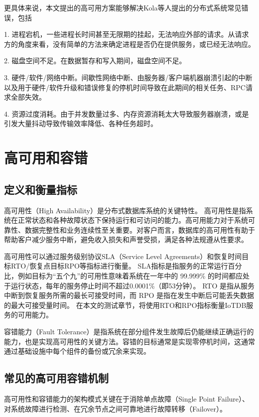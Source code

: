 更具体来说，本文提出的高可用方案能够解决Kola\cite{kola2005faults}等人提出的分布式系统常见错误，包括

1. 进程宕机，一些进程长时间甚至无限期的挂起，无法响应外部的请求。从请求方的角度来看，没有简单的方法来确定进程是否仍在提供服务，或已经无法响应。

2. 磁盘空间不足。在数据暂存和写入期间，磁盘空间不足。

3. 硬件/软件/网络中断。间歇性网络中断、由服务器/客户端机器崩溃引起的中断以及用于硬件/软件升级和错误修复的停机时间导致在此期间的相关任务、RPC请求全部失效。

4. 资源过度消耗。由于并发数量过多、内存资源消耗太大导致服务器崩溃，或是引发大量抖动导致传输效率降低、各种任务超时。


\section{高可用和容错}

\subsection{定义和衡量指标}

高可用性（High Availability）是分布式数据库系统的关键特性。
高可用性是指系统在正常状态和各种故障状态下保持运行和可访问的能力。高可用能力对于系统可靠性、数据完整性和业务连续性至关重要。对客户而言，数据库的高可用性有助于帮助客户减少服务中断，避免收入损失和声誉受损，满足各种法规遵从性要求。


高可用性可以通过服务级别协议SLA（Service Level Agreements）和恢复时间目标RTO/恢复点目标RPO等指标进行衡量。
SLA指标是指服务的正常运行百分比，例如目标为“五个九”的可用性意味着系统在一年中的 99.999\% 的时间都应处于运行状态，每年的服务停止时间不超过0.0001\%（即53分钟）。
RTO 是指从服务中断到恢复服务所需的最长可接受时间，而 RPO 是指在发生中断后可能丢失数据的最大可接受量时间。
在本文的测试章节，将使用RTO和RPO指标衡量IoTDB服务的可用能力。

容错能力（Fault Tolerance）是指系统在部分组件发生故障后仍能继续正确运行的能力\cite{lee1990fault}，也是实现高可用性的关键方法。容错的目标通常是实现零停机时间，这通常通过基础设施中每个组件的备份或冗余来实现。


\subsection{常见的高可用容错机制}

高可用性和容错能力的架构模式关键在于消除单点故障（Single Point Failure）、对系统故障进行检测、在冗余节点之间可靠地进行故障转移（Failover）。

